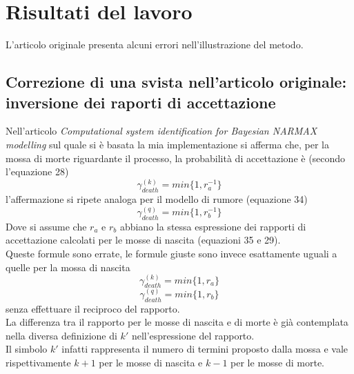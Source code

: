 \chapter{Risultati del lavoro}
L'articolo originale presenta alcuni errori nell'illustrazione del metodo.\\
\section*{Correzione di una svista nell'articolo originale: inversione dei raporti di accettazione}
Nell'articolo \emph{Computational system identification for Bayesian
NARMAX modelling}  sul quale si è basata la mia implementazione si afferma che, per la mossa di morte riguardante il processo, la probabilità di accettazione è (secondo l'equazione 28)
\begin{equation}
\gamma_{death}^{(k)}=min\{1,r_a^{-1}\}
\end{equation}
l'affermazione si ripete analoga per il modello di rumore (equazione 34)
\begin{equation}
\gamma_{death}^{(q)}=min\{1,r_b^{-1}\}
\end{equation}
Dove si assume che $r_a$ e $r_b$ abbiano la stessa espressione dei rapporti di accettazione calcolati per le mosse di nascita (equazioni 35 e 29).\\
Queste formule sono errate, le formule giuste sono invece esattamente uguali a quelle per la mossa di nascita
\begin{equation}
\gamma_{death}^{(k)}=min\{1,r_a\}
\end{equation}
\begin{equation}
\gamma_{death}^{(q)}=min\{1,r_b\}
\end{equation}
senza effettuare il reciproco del rapporto.\\
La differenza tra il rapporto per le mosse di nascita e di morte è già contemplata nella diversa definizione di $k'$ nell'espressione del rapporto.\\
Il simbolo $k'$ infatti rappresenta il numero di termini proposto dalla mossa e vale rispettivamente $k+1$ per le mosse di nascita e $k-1$ per le mosse di morte.


